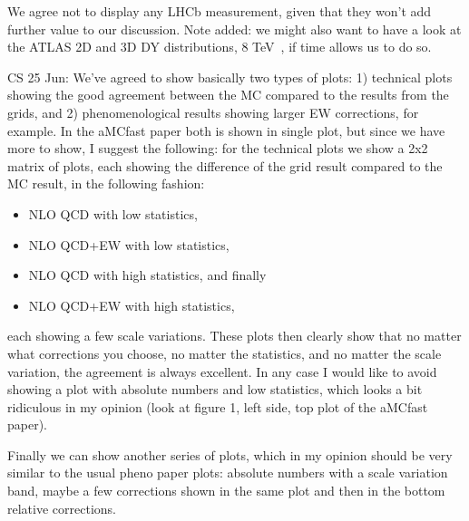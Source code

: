 We agree not to display any LHCb measurement, given that they won't add
further value to our discussion.
Note added: we might also want to have a look at the ATLAS 2D and 3D DY
distributions, 8 TeV~\cite{Aad:2016zzw,Aaboud:2017ffb}, if time allows
us to do so.

CS 25 Jun: We've agreed to show basically two types of plots: 1) technical plots showing the good agreement between the MC compared to the results from the grids, and 2) phenomenological results showing larger EW corrections, for example.
In the aMCfast paper both is shown in single plot, but since we have more to show, I suggest the following: for the technical plots we show a 2x2 matrix of plots, each showing the difference of the grid result compared to the MC result, in the following fashion:
\begin{itemize}
\item NLO QCD with low statistics,
\item NLO QCD+EW with low statistics,
\item NLO QCD with high statistics, and finally
\item NLO QCD+EW with high statistics,
\end{itemize}
each showing a few scale variations.
These plots then clearly show that no matter what corrections you choose, no matter the statistics, and no matter the scale variation, the agreement is always excellent.
In any case I would like to avoid showing a plot with absolute numbers and low statistics, which looks a bit ridiculous in my opinion (look at figure 1, left side, top plot of the aMCfast paper).

Finally we can show another series of plots, which in my opinion should be very similar to the usual pheno paper plots: absolute numbers with a scale variation band, maybe a few corrections shown in the same plot and then in the bottom relative corrections.
